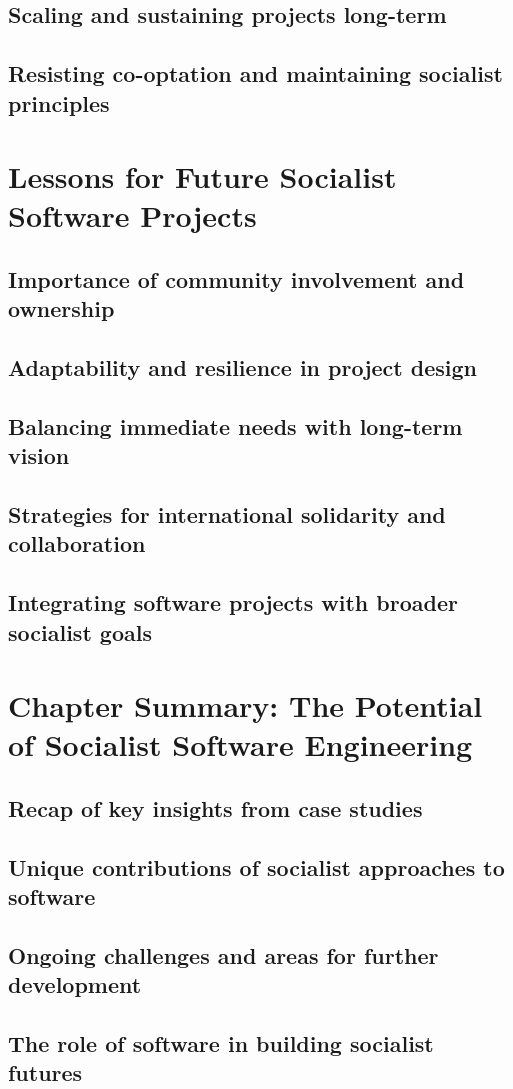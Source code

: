 \subsection{Scaling and sustaining projects long-term}
\subsection{Resisting co-optation and maintaining socialist principles}

\newpage

\section{Lessons for Future Socialist Software Projects}
\subsection{Importance of community involvement and ownership}
\subsection{Adaptability and resilience in project design}
\subsection{Balancing immediate needs with long-term vision}
\subsection{Strategies for international solidarity and collaboration}
\subsection{Integrating software projects with broader socialist goals}

\newpage

\section{Chapter Summary: The Potential of Socialist Software Engineering}
\subsection{Recap of key insights from case studies}
\subsection{Unique contributions of socialist approaches to software}
\subsection{Ongoing challenges and areas for further development}
\subsection{The role of software in building socialist futures}